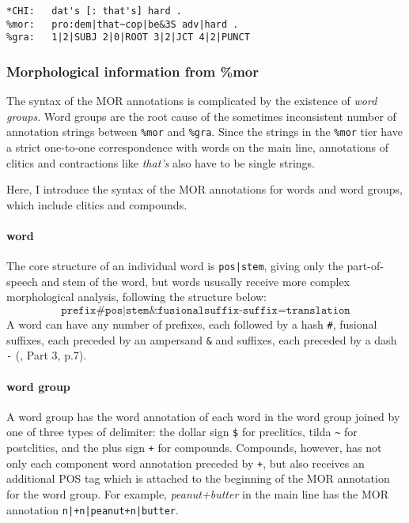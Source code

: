 \lstset{
numbers = none,
frame = single,
}

\begin{lstlisting}[caption={Example to show the different number of strings in \texttt{\%mor} and \texttt{\&gra} tiers due to contracted form \emph{that's}.}, label={lst:chatsent3}]
*CHI:   dat's [: that's] hard .
%mor:   pro:dem|that~cop|be&3S adv|hard .
%gra:   1|2|SUBJ 2|0|ROOT 3|2|JCT 4|2|PUNCT
\end{lstlisting}

\subsubsection{Morphological information from \%mor}

The syntax of the MOR annotations is complicated by the existence of \emph{word groups}. Word groups are the root cause of the sometimes inconsistent number of annotation strings between \texttt{\%mor} and \texttt{\%gra}. Since the strings in the \texttt{\%mor} tier have a strict one-to-one correspondence with words on the main line, annotations of clitics and contractions like \emph{that's} also have to be single strings.

Here, I introduce the syntax of the MOR annotations for words and word groups, which include clitics and compounds.

\paragraph{word}
The core structure of an individual word is \texttt{pos|stem}, giving only the part-of-speech and stem of the word, but words ususally receive more complex morphological analysis, following the structure below:
$$\texttt{prefix\#pos|stem\&fusionalsuffix-suffix=translation}$$
A word can have any number of prefixes, each followed by a hash \texttt{\#}, fusional suffixes, each preceded by an ampersand \texttt{\&} and suffixes, each preceded by a dash \texttt{-} (\cite{Macwhinney2000}, Part 3, p.7).

\paragraph{word group}
A word group has the word annotation of each word in the word group joined by one of three types of delimiter: the dollar sign \texttt{\$} for preclitics, tilda \texttt{\~{}} for postclitics, and the plus sign \texttt{+} for compounds. Compounds, however, has not only each component word annotation preceded by \texttt{+}, but also receives an additional POS tag which is attached to the beginning of the MOR annotation for the word group. For example, \emph{peanut+butter} in the main line has the MOR annotation \texttt{n|+n|peanut+n|butter}.

